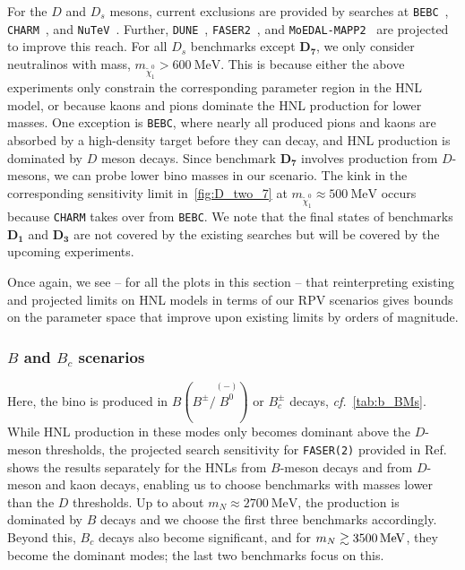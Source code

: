 For the $D$ and $D_s$ mesons, current exclusions are provided by searches at 
\texttt{BEBC}~\cite{WA66:1985mfx, Barouki:2022bkt}, \texttt{CHARM}~\cite{CHARM:1985nku}, 
and \texttt{NuTeV}~\cite{NuTeV:1999kej}.
Further, \texttt{DUNE}~\cite{Ballett:2019bgd}, \texttt{FASER2}~\cite{Kling:2018wct}, and \texttt{MoEDAL-MAPP2}~\cite{DeVries:2020jbs,Beltran:2023nli} are projected to improve this reach. For all $D_s$ benchmarks except 
$\bm{D_7}$, we only consider neutralinos with mass, $m_{\tilde{\chi}^0_1} > \SI{600}{\MeV}$.
This is because either the above experiments only constrain the corresponding parameter 
region in the HNL model, or because kaons and pions dominate the HNL production for 
lower masses. One exception is \texttt{BEBC}, where nearly all produced pions and kaons 
are absorbed by a high-density target before they can decay, and HNL production is 
dominated by $D$ meson decays. Since benchmark $\bm{D_7}$ involves production from 
$D$-mesons, we can probe lower bino masses in our scenario.
The kink in the corresponding sensitivity limit in~\cref{fig:D_two_7} at $m_{\tilde{\chi}_1^0} \approx \SI{500}{\MeV}$ occurs because \texttt{CHARM} takes over from \texttt{BEBC}.
We note that the final states of benchmarks $\bm{D_1}$ and $\bm{D_3}$ are not covered by the existing searches but will be covered by the upcoming experiments. 



Once again, we see -- for all the plots in this section -- that reinterpreting existing 
and projected limits on HNL models in terms of our RPV scenarios gives bounds on the 
parameter space that improve upon existing limits by orders of magnitude.


\subsubsection{$B$ and $B_c$ scenarios} 
%
Here, the bino is produced in $B (B^\pm/\overset{\scriptscriptstyle(-)}{B^0})$ or $B^\pm_c$ 
decays, \textit{cf.}~\cref{tab:b_BMs}. While HNL production in these 
modes only becomes dominant above the $D$-meson thresholds, the projected search 
sensitivity for \texttt{FASER(2)} provided in Ref.~\cite{Kling:2018wct} shows the results separately for the HNLs from $B$-meson decays and from $D$-meson and kaon 
decays, enabling us to choose benchmarks with masses lower than the $D$ thresholds. Up 
to about $m_N \approx \SI{2700}{\MeV}$, the production is dominated by $B$ decays and we choose 
the first three benchmarks accordingly. Beyond this, $B_c$ decays also become 
significant, and for $m_N \gsim \SI{3500}{\MeV}$, they become the dominant modes; 
the last two benchmarks focus on this.

